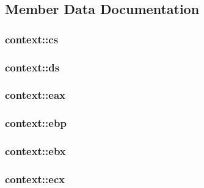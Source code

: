 \subsection{Member Data Documentation}
\hypertarget{structcontext_a29cb887d9a426ddb24c04237bce5df6d}{}
\subsubsection[{cs}]{ context\+::cs}\label{structcontext_a29cb887d9a426ddb24c04237bce5df6d}
\hypertarget{structcontext_ae636622afec7fe9c8b18504168023d1e}{}
\subsubsection[{ds}]{ context\+::ds}\label{structcontext_ae636622afec7fe9c8b18504168023d1e}
\hypertarget{structcontext_ab91accfc2d53d57c615cf40235a01889}{}
\subsubsection[{eax}]{ context\+::eax}\label{structcontext_ab91accfc2d53d57c615cf40235a01889}
\hypertarget{structcontext_a7ed33e51ef51493c861cd20aa919f2f9}{}
\subsubsection[{ebp}]{ context\+::ebp}\label{structcontext_a7ed33e51ef51493c861cd20aa919f2f9}
\hypertarget{structcontext_aa1a5259f18285c424a8d38edd035f38b}{}
\subsubsection[{ebx}]{ context\+::ebx}\label{structcontext_aa1a5259f18285c424a8d38edd035f38b}
\hypertarget{structcontext_ad0067b404e6853bcf37d3f74a6f0294b}{}
\subsubsection[{ecx}]{ context\+::ecx}\label{structcontext_ad0067b404e6853bcf37d3f74a6f0294b}
\hypertarget{structcontext_a2fd21838138987e11b4ff201b2e84b3b}{}
